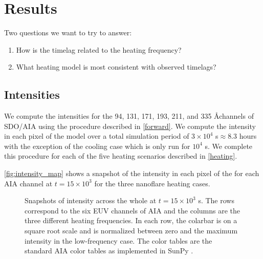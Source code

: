 \section{Results}\label{results}

Two questions we want to try to answer:
\begin{enumerate}
    \item How is the timelag related to the heating frequency?
    \item What heating model is most consistent with observed timelags?
\end{enumerate}

\subsection{Intensities}

We compute the intensities for the 94, 131, 171, 193, 211, and 335 \AA channels of SDO/AIA using the procedure described in \autoref{forward}. We compute the intensity in each pixel of the model \AR over a total simulation period of $3\times10^4$ s$\approx8.3$ hours with the exception of the cooling case which is only run for $10^4$ s. We complete this procedure for each of the five heating scenarios described in \autoref{heating}. 

\autoref{fig:intensity_map} shows a snapshot of the intensity in each pixel of the \AR for each AIA channel at $t=15\times10^3$ for the three nanoflare heating cases.

\begin{figure*}
    \caption{Snapshots of intensity across the whole \AR at $t=15\times10^3$ s. The rows correspond to the six EUV channels of AIA and the columns are the three different heating frequencies. In each row, the colarbar is on a square root scale and is normalized between zero and the maximum intensity in the low-frequency case. The color tables are the standard AIA color tables as implemented in SunPy \citep{sunpy_community_sunpypython_2015}.}
    \label{fig:intensity_map}
\end{figure*}

